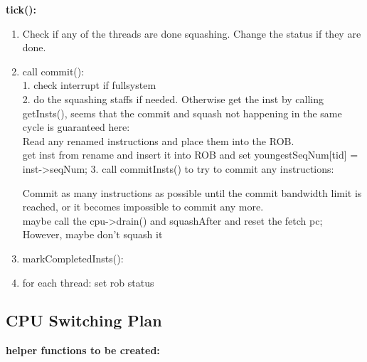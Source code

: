 \documentclass[11pt]{article}
\begin{document}
\textbf{tick():}
\begin{enumerate}
	\item Check if any of the threads are done squashing.  Change the status if they are done.\\
	
	\item call commit():\\
	
	1. check interrupt if fullsystem\\
	
	2. do the squashing staffs if needed. Otherwise get the inst by calling getInsts(), seems that the commit and squash not happening in the same cycle is guaranteed here:\\
	
	\-\hspace{1cm} Read any renamed instructions and place them into the ROB.\\
	
	\-\hspace{1cm} get inst from rename and insert it into ROB and set youngestSeqNum[tid] = inst-\textgreater seqNum;
	3. call commitInsts() to try to commit any instructions:
	
	\-\hspace{1cm} Commit as many instructions as possible until the commit bandwidth limit is reached, or it becomes impossible to commit any more.\\
	
	maybe call the cpu-\textgreater drain() and squashAfter and reset the fetch pc; However, maybe don't squash it
	\item markCompletedInsts():\\
	
	\item for each thread: set rob status
\end{enumerate}

\subsection{CPU Switching Plan\\}

\textbf{helper functions to be created:\\}
\end{document}
